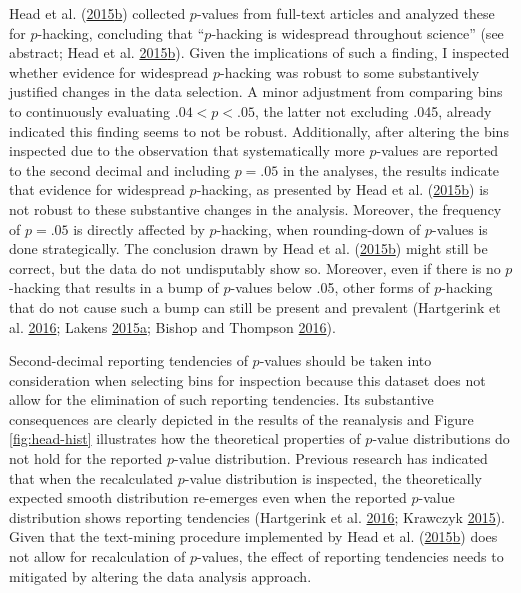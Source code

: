 \documentclass[a5paper]{book}
\begin{document}
Head et al.
(\protect\hyperlink{ref-doi:10.1371ux2fjournal.pbio.1002106}{2015}\protect\hyperlink{ref-doi:10.1371ux2fjournal.pbio.1002106}{b})
collected \(p\)-values from full-text articles and analyzed these for
\(p\)-hacking, concluding that \enquote{\(p\)-hacking is widespread
throughout science} (see abstract; Head et al.
\protect\hyperlink{ref-doi:10.1371ux2fjournal.pbio.1002106}{2015}\protect\hyperlink{ref-doi:10.1371ux2fjournal.pbio.1002106}{b}).
Given the implications of such a finding, I inspected whether evidence
for widespread \(p\)-hacking was robust to some substantively justified
changes in the data selection. A minor adjustment from comparing bins to
continuously evaluating \(.04<p<.05\), the latter not excluding .045,
already indicated this finding seems to not be robust. Additionally,
after altering the bins inspected due to the observation that
systematically more \(p\)-values are reported to the second decimal and
including \(p=.05\) in the analyses, the results indicate that evidence
for widespread \(p\)-hacking, as presented by Head et al.
(\protect\hyperlink{ref-doi:10.1371ux2fjournal.pbio.1002106}{2015}\protect\hyperlink{ref-doi:10.1371ux2fjournal.pbio.1002106}{b})
is not robust to these substantive changes in the analysis. Moreover,
the frequency of \(p=.05\) is directly affected by \(p\)-hacking, when
rounding-down of \(p\)-values is done strategically. The conclusion
drawn by Head et al.
(\protect\hyperlink{ref-doi:10.1371ux2fjournal.pbio.1002106}{2015}\protect\hyperlink{ref-doi:10.1371ux2fjournal.pbio.1002106}{b})
might still be correct, but the data do not undisputably show so.
Moreover, even if there is no \(p\)-hacking that results in a bump of
\(p\)-values below .05, other forms of \(p\)-hacking that do not cause
such a bump can still be present and prevalent (Hartgerink et al.
\protect\hyperlink{ref-doi:10.7717ux2fpeerj.1935}{2016}; Lakens
\protect\hyperlink{ref-doi:10.1080ux2f17470218.2014.982664}{2015}\protect\hyperlink{ref-doi:10.1080ux2f17470218.2014.982664}{a};
Bishop and Thompson
\protect\hyperlink{ref-doi:10.7717ux2fpeerj.1715}{2016}).

Second-decimal reporting tendencies of \(p\)-values should be taken into
consideration when selecting bins for inspection because this dataset
does not allow for the elimination of such reporting tendencies. Its
substantive consequences are clearly depicted in the results of the
reanalysis and Figure \ref{fig:head-hist} illustrates how the
theoretical properties of \(p\)-value distributions do not hold for the
reported \(p\)-value distribution. Previous research has indicated that
when the recalculated \(p\)-value distribution is inspected, the
theoretically expected smooth distribution re-emerges even when the
reported \(p\)-value distribution shows reporting tendencies (Hartgerink
et al. \protect\hyperlink{ref-doi:10.7717ux2fpeerj.1935}{2016}; Krawczyk
\protect\hyperlink{ref-doi:10.1371ux2fjournal.pone.0127872}{2015}).
Given that the text-mining procedure implemented by Head et al.
(\protect\hyperlink{ref-doi:10.1371ux2fjournal.pbio.1002106}{2015}\protect\hyperlink{ref-doi:10.1371ux2fjournal.pbio.1002106}{b})
does not allow for recalculation of \(p\)-values, the effect of
reporting tendencies needs to mitigated by altering the data analysis
approach.
\end{document}

